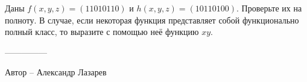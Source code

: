 \question
Даны $f(x, y, z) = (11010110)$ и $h(x, y, z) = (10110100)$. Проверьте их на полноту. В случае, если некоторая функция представляет собой функционально полный класс, то выразите с помощью неё функцию  $xy$.

---------------

Автор -- Александр Лазарев